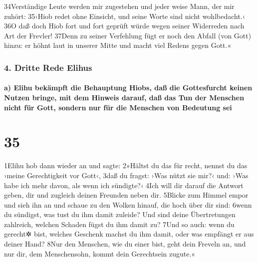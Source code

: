 34Verständige Leute werden mir zugestehen und jeder weise Mann, der mir
zuhört: 35›Hiob redet ohne Einsicht, und seine Worte sind nicht
wohlbedacht.‹ 36O daß doch Hiob fort und fort geprüft würde wegen seiner
Widerreden nach Art der Frevler! 37Denn zu seiner Verfehlung fügt er
noch den Abfall (von Gott) hinzu: er höhnt laut in unserer Mitte und
macht viel Redens gegen Gott.«

\hypertarget{dritte-rede-elihus}{%
\subsubsection{4. Dritte Rede Elihus}\label{dritte-rede-elihus}}

\hypertarget{a-elihu-bekuxe4mpft-die-behauptung-hiobs-dauxdf-die-gottesfurcht-keinen-nutzen-bringe-mit-dem-hinweis-darauf-dauxdf-das-tun-der-menschen-nicht-fuxfcr-gott-sondern-nur-fuxfcr-die-menschen-von-bedeutung-sei}{%
\paragraph{a) Elihu bekämpft die Behauptung Hiobs, daß die Gottesfurcht
keinen Nutzen bringe, mit dem Hinweis darauf, daß das Tun der Menschen
nicht für Gott, sondern nur für die Menschen von Bedeutung
sei}\label{a-elihu-bekuxe4mpft-die-behauptung-hiobs-dauxdf-die-gottesfurcht-keinen-nutzen-bringe-mit-dem-hinweis-darauf-dauxdf-das-tun-der-menschen-nicht-fuxfcr-gott-sondern-nur-fuxfcr-die-menschen-von-bedeutung-sei}}

\hypertarget{section-34}{%
\section{35}\label{section-34}}

1Elihu hob dann wieder an und sagte: 2»Hältst du das für recht, nennst
du das ›meine Gerechtigkeit vor Gott‹, 3daß du fragst: ›Was nützt sie
mir?‹ und: ›Was habe ich mehr davon, als wenn ich sündigte?‹ 4Ich will
dir darauf die Antwort geben, dir und zugleich deinen Freunden neben
dir. 5Blicke zum Himmel empor und sieh ihn an und schaue zu den Wolken
hinauf, die hoch über dir sind: 6wenn du sündigst, was tust du ihm damit
zuleide? Und sind deine Übertretungen zahlreich, welchen Schaden fügst
du ihm damit zu? 7Und so auch: wenn du gerecht✲ bist, welches Geschenk
machst du ihm damit, oder was empfängt er aus deiner Hand? 8Nur den
Menschen, wie du einer bist, geht dein Freveln an, und nur dir, dem
Menschensohn, kommt dein Gerechtsein zugute.«

